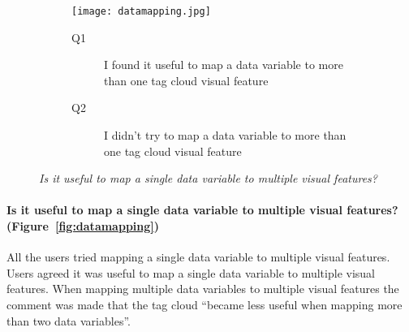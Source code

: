 \begin{figure}[!htb]
\centering
\begin{subfigure}{.5\textwidth}
	\centering
	\texttt{[image: datamapping.jpg]}
\end{subfigure}%
\begin{subfigure}{.5\textwidth}
  \begin{description}
	\item[Q1]I found it useful to map a data variable to more than one tag cloud visual feature
	\item[Q2]I didn't try to map a data variable to more than one tag cloud visual feature
  \end{description}
\end{subfigure}
\caption{\textit{Is it useful to map a single data variable to multiple visual features?}}
\label{fig:datamapping}
\end{figure}

\paragraph{Is it useful to map a single data variable to multiple visual features? (Figure~\vref{fig:datamapping})}

All the users tried mapping a single data variable to multiple visual features. Users agreed it was useful to map a single data variable to multiple visual features. When mapping multiple data variables to multiple visual features the comment was made that the tag cloud ``became less useful when mapping more than two data variables''.



